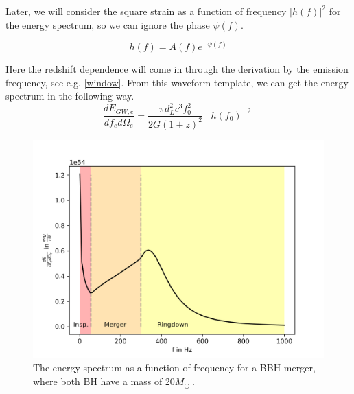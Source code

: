 Later, we will consider the square strain as a function of frequency $|h(f)|^2$ for the energy spectrum, so we can ignore the phase $\psi(f)$.

\begin{equation}
    h(f)=A(f)e^{-\psi(f)}
\end{equation}

Here the redshift dependence will come in through the derivation by the emission 
frequency, see e.g. \ref{window}. From this waveform template, we can get the energy 
spectrum in the following way.
\begin{equation}
    \frac{dE_{GW,e}}{df_e d\Omega_e} = \frac{\pi d_L^2 c^3f_0^2}{2G(1+z)^2}
    \mid h(f_0)\mid ^2
\end{equation}

\begin{figure}[h]
    \centering
    \includegraphics[width=0.7\linewidth]{Images/dE_df_of_f.png}
    \caption{The energy spectrum as a function of frequency for a BBH merger, where both BH have a mass of 20$M_\odot\ $. }
    \label{dE_df_f}
\end{figure} 
